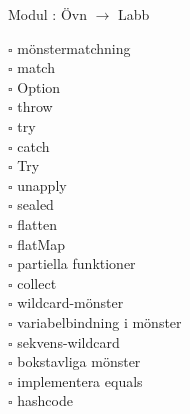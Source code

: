 
    Modul : Övn  $\rightarrow$ Labb 
    \begin{multicols}{3}\SlideFontTiny
    $\square$ mönstermatchning \\
$\square$ match \\
$\square$ Option \\
$\square$ throw \\
$\square$ try \\
$\square$ catch \\
$\square$ Try \\
$\square$ unapply \\
$\square$ sealed \\
$\square$ flatten \\
$\square$ flatMap \\
$\square$ partiella funktioner \\
$\square$ collect \\
$\square$ wildcard-mönster \\
$\square$ variabelbindning i mönster \\
$\square$ sekvens-wildcard \\
$\square$ bokstavliga mönster \\
$\square$ implementera equals \\
$\square$ hashcode \\
    \end{multicols}
    